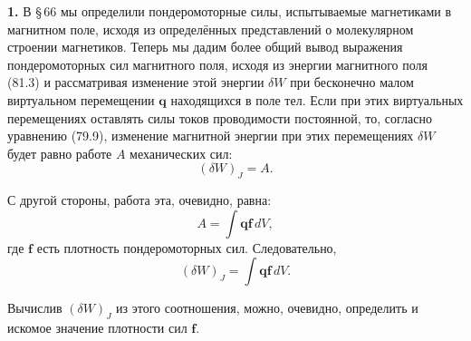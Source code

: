 \documentclass[a4paper,10pt]{article}
\begin{document}



\medskip
\textbf{1.} В §\,66 мы определили пондеромоторные силы, испытываемые
магнетиками в магнитном поле, исходя из определённых представлений
о молекулярном строении магнетиков. Теперь мы дадим более общий вывод
выражения пондеромоторных сил магнитного поля, исходя из энергии
магнитного поля (81.3) и рассматривая изменение этой энергии $\delta W$
при бесконечно малом виртуальном перемещении $\mathbf{q}$ находящихся
в поле тел. Если при этих виртуальных перемещениях оставлять силы токов
проводимости постоянной, то, согласно уравнению (79.9), изменение
магнитной энергии при этих перемещениях $\delta W$ будет равно работе
$A$ механических сил:
$$
    (\delta W)_J = A.
$$


С другой стороны, работа эта, очевидно, равна:
$$
    A = \int \mathbf{q}\mathbf{f}\,dV,
$$
где $\mathbf{f}$ есть плотность пондеромоторных сил. Следовательно,
\begin{equation}
    (\delta W)_J = \int \mathbf{q}\mathbf{f}\,dV.
    \tag{83.1}
\end{equation}

Вычислив $(\delta W)_J$ из этого соотношения, можно, очевидно,
определить и искомое значение плотности сил $\mathbf{f}$.
\end{document}
